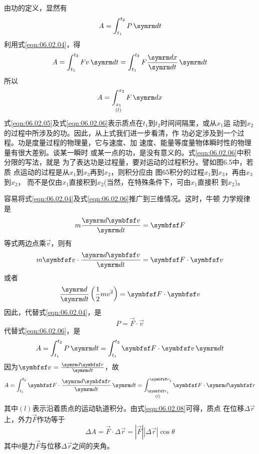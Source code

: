 由功的定义，显然有
\begin{equation}\label{eqn:06.02.05}
 A = \int _ { t _ { 1 } } ^ { t _ { 2 } } P \dif t
\end{equation}
利用式\eqref{eqn:06.02.04}，得
\begin{equation*}
 A = \int _ { t _ { 1 } } ^ { t _ { 2 } } F v \dif t = \int _ { t _ { 1 } } ^ { t_ { 2 } } F \frac { \dif x } { \dif t } \dif t
\end{equation*}
所以
\begin{equation}\label{eqn:06.02.06}
 A = \mathop{\int _ { x _ { 1 } } ^ { x _ { 2 } }}\limits _ { ( l ) } F \dif x
\end{equation}
式\eqref{eqn:06.02.05}及式\eqref{eqn:06.02.06}表示质点在$ t_1 $到$ t_2 $时间间隔里，或从$ x_1 $运
动到$ x_2 $的过程中所涉及的功。因此，从上式我们进一步看清，作
功必定涉及到一个过程。功是度量过程的物理量，它与速度、加
速度、能量等度量物体瞬时性的物理量有很大差别。谈某一瞬时
或某一点的功，是没有意义的。式\eqref{eqn:06.02.06}中积分限的写法，就是
为了表达功是过程量，要对运动的过程积分。譬如图6.5中，若质
点运动的过程是从$ x_1 $到$ x_3 $再到$ x_2 $，则积分应由
图65积分的过程$ x_1 $到$ x_3 $，再由$ x_3 $到$ x_2 $，
而不是仅由$ x_1 $直接积到$ x_2 $(当然，在特殊条件下，可由$ x_1 $直接积
到$ x_2 $)。

容易将式\eqref{eqn:06.02.04}及式\eqref{eqn:06.02.06}推广到三维情况。这时，牛顿
力学规律是
\begin{equation*}
 m \frac { \dif \vec{ v } } { \dif t } = \vec{F}
\end{equation*}
等式两边点乘$ \vec{ v } $，则有
\begin{equation*}
 m \vec{v} \cdot \frac { \dif \vec{v} } { \dif t } = \vec{F} \cdot \vec{v}
\end{equation*}
或者
\begin{equation*}
 \frac { \dif } { \dif t } \left( \frac { 1 } { 2 } m v ^ { 2 } \right) = \vec{F} \cdot \vec{v}
\end{equation*}
因此，代替式\eqref{eqn:06.02.04}，是
\begin{equation}\label{eqn:06.02.07}
 P = \vec{F} \cdot \vec{v}
\end{equation}
代替式\eqref{eqn:06.02.06}，是
\begin{equation*}
 A = \int _ { t _ { 1 } } ^ { t _ { 2 } } P \dif t = \int _ { t _ { 1 } } ^ { t _ { 2 } } \vec{F} \cdot \vec{v} \dif t
\end{equation*}
因为$ \vec{ v } = \frac { \dif \vec{ r } } { \dif t } $，故
\begin{equation}\label{eqn:06.02.08}
 A = \int _ { t _ { 1 } } ^ { t _ { 2 } } \vec{ F } \cdot \frac { \dif \vec { r } } { \dif t } \dif t = \mathop{\int _ { \vec{r} _ { 1 } } ^ { \vec{r} _ { 2 } }}\limits _ { ( l ) } \vec{F} \cdot \dif \vec{r}
\end{equation}
其中$ (l) $表示沿着质点的运动轨道积分。由式\eqref{eqn:06.02.08}可得，质点
在位移$ \Delta \vec{r} $上，外力$ \vec{F} $作功等于
\begin{equation}\label{eqn:06.02.09}
 \Delta A = \vec{F} \cdot \Delta \vec{r} = |\vec{F}| |\Delta \vec{r}| \cos \theta
\end{equation}
其中$ \theta $是力$ \vec{F} $与位移$ \Delta \vec{r} $之间的夹角。